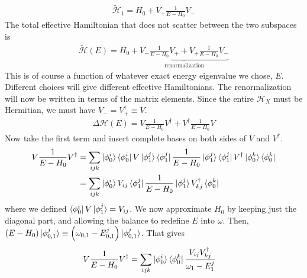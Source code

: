 \begin{equation}\begin{aligned}
	\tilde{\mathcal{H}}_1 = H_0 + V_+\frac{1}{E - H_0}V_-
\end{aligned}\end{equation}
The total effective Hamiltonian that does not scatter between the two subspaces is
\begin{equation}\begin{aligned}
	\tilde{\mathcal{H}}(E) = H_0 + \underbrace{V_-\frac{1}{E - H_0}V_+ +  V_+\frac{1}{E - H_0}V_-}_\text{renormalization}
\end{aligned}\end{equation}
This is of course a function of whatever exact energy eigenvalue we chose, \(E\). Different choices will give different effective Hamiltonians. The renormalization will now be written in terms of the matrix elements. Since the entire \(\mathcal{H}_X\) must be Hermitian, we must have \(V_- = V_+^\dagger \equiv V\).
\begin{equation}\begin{aligned}
\Delta \mathcal{H}(E) = V\frac{1}{E - H_0}V^\dagger +  V^\dagger\frac{1}{E - H_0}V
\end{aligned}\end{equation}
Now take the first term and insert complete bases on both sides of \(V\) and \(V^\dagger\).
\begin{equation}\begin{aligned}
V\frac{1}{E - H_0}V^\dagger &= \sum_{ijk}\ket{\phi_0^i}\bra{\phi_0^i}V\ket{\phi_1^j}\bra{\phi_1^j}\frac{1}{E - H_0}\ket{\phi_1^j}\bra{\phi_1^j}V^\dagger\ket{\phi_0^k}\bra{\phi_0^k} \\
                &= \sum_{ijk}\ket{\phi_0^i}V_{ij}\bra{\phi_1^j}\frac{1}{E - H_0}\ket{\phi_1^j}V^\dagger_{kj}\bra{\phi_0^k}\\
\end{aligned}\end{equation}
where we defined \(\bra{\phi_0^i}V\ket{\phi_1^j} = V_{ij}\). We now approximate \(H_0\) by keeping just the diagonal part, and allowing the balance to redefine \(E\) into \(\omega\). Then, \(\left(E - H_0\right) \ket{\phi_{0,1}^j} \equiv \left(\omega_{0,1} - E_{0,1}^j\right) \ket{\phi_{0,1}^j}\). That gives
\begin{equation}\begin{aligned}
\label{pms_dropV}
V\frac{1}{E - H_0}V^\dagger &= \sum_{ijk}\ket{\phi_0^i}\bra{\phi_0^k}\frac{V_{ij}V^\dagger_{kj}}{\omega_1 - E^j_1}
\end{aligned}\end{equation}
